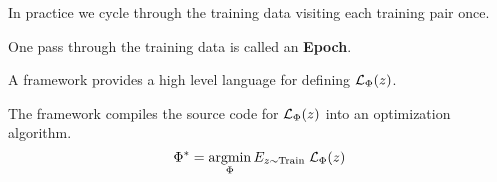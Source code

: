 {

In practice we cycle through the training data visiting each training pair once.

\vfill
One pass through the training data is called an {\bf Epoch}.


A framework provides a high level language for defining {\color{red} ${\cal L}_\Phi(z)$}.

\vfill
The framework compiles the source code for ${\cal L}_\Phi(z)$ into an optimization algorithm.
\vfill
{\color{red} $$\Phi^* = \operatorname*{argmin}_\Phi E_{z \sim \mathrm{Train}} \; {\cal L}_\Phi(z)$$}

}


